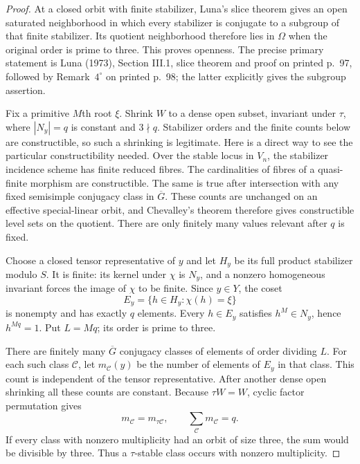 \begin{proof}
At a closed orbit with finite stabilizer, Luna's slice theorem
gives an open saturated neighborhood in which every stabilizer
is conjugate to a subgroup of that finite stabilizer.  Its
quotient neighborhood therefore lies in $\Omega$ when the original
order is prime to three.  This proves openness.  The precise
primary statement is Luna (1973), Section III.1, slice theorem
and proof on printed p.~97, followed by Remark~$4^\circ$ on
printed p.~98; the latter explicitly gives the subgroup assertion.

Fix a primitive $M$th root $\xi$.  Shrink $W$ to a dense open
subset, invariant under $\tau$, where $|N_y|=q$ is constant and
$3\nmid q$.  Stabilizer orders and the finite counts below are
constructible, so such a shrinking is legitimate.  Here is a
direct way to see the particular constructibility needed.  Over
the stable locus in $V_n$, the stabilizer incidence scheme has
finite reduced fibres.  The cardinalities of fibres of a
quasi-finite morphism are constructible.  The same is true after
intersection with any fixed semisimple conjugacy class in
$\overline G$.  These counts are unchanged on an effective
special-linear orbit, and Chevalley's theorem therefore gives
constructible level sets on the quotient.  There are only
finitely many values relevant after $q$ is fixed.

Choose a closed tensor representative of $y$ and let $H_y$ be
its full product stabilizer modulo $S$.  It is finite: its
kernel under $\chi$ is $N_y$, and a nonzero homogeneous invariant
forces the image of $\chi$ to be finite.  Since $y\in Y$, the
coset
\[
                 E_y=\{h\in H_y:\chi(h)=\xi\}
                                                        \tag{K-028a}
\]
is nonempty and has exactly $q$ elements.  Every $h\in E_y$
satisfies $h^M\in N_y$, hence $h^{Mq}=1$.  Put $L=Mq$;
its order is prime to three.

There are finitely many $\overline G$ conjugacy classes of
elements of order dividing $L$.  For each such class $\mathcal C$,
let $m_{\mathcal C}(y)$ be the number of elements of $E_y$ in
that class.  This count is independent of the tensor representative.
After another dense open shrinking all these counts are constant.
Because $\tau W=W$, cyclic factor permutation gives
\[
 m_{\mathcal C}=m_{\tau\mathcal C},\qquad
                     \sum_{\mathcal C}m_{\mathcal C}=q.
                                                        \tag{K-028b}
\]
If every class with nonzero multiplicity had an orbit of size
three, the sum would be divisible by three.  Thus a
$\tau$-stable class occurs with nonzero multiplicity.


\end{proof}
